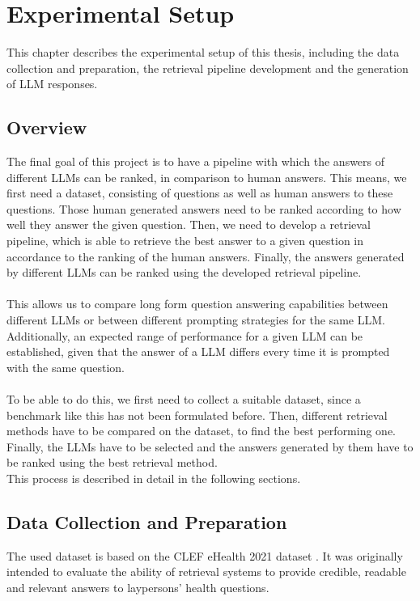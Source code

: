 \chapter{Experimental Setup}
This chapter describes the experimental setup of this thesis, including the data collection and preparation, the retrieval pipeline development and the generation of LLM responses.

\section{Overview}\label{sec:overview}
The final goal of this project is to have a pipeline with which the answers of different LLMs can be ranked, in comparison to human answers.
This means, we first need a dataset, consisting of questions as well as human answers to these questions.
Those human generated answers need to be ranked according to how well they answer the given question.
Then, we need to develop a retrieval pipeline, which is able to retrieve the best answer to a given question in accordance to the ranking of the human answers.
Finally, the answers generated by different LLMs can be ranked using the developed retrieval pipeline.
\\\\
This allows us to compare long form question answering capabilities between different LLMs or between different prompting strategies for the same LLM.
Additionally, an expected range of performance for a given LLM can be established, given that the answer of a LLM differs every time it is prompted with the same question.
\\\\
To be able to do this, we first need to collect a suitable dataset, since a benchmark like this has not been formulated before.
Then, different retrieval methods have to be compared on the dataset, to find the best performing one.
Finally, the LLMs have to be selected and the answers generated by them have to be ranked using the best retrieval method.
\\
This process is described in detail in the following sections.

\section{Data Collection and Preparation}
The used dataset is based on the CLEF eHealth 2021 dataset \cite{goeuriot:2021}.
It was originally intended to evaluate the ability of retrieval systems to provide credible, readable and relevant answers to laypersons' health questions.

